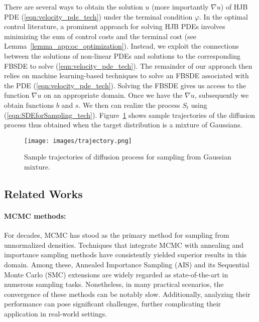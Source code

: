 There are several ways to obtain the solution $u$ (more importantly $\nabla u$) of HJB PDE (\ref{eqn:velocity_pde_tech}) under the terminal condition $\varphi$. In the optimal control literature, a prominent approach for solving HJB PDEs involves minimizing the sum of control costs and the terminal cost (see Lemma~\ref{lemma_app:oc_optimization}). %
Instead, we exploit the connections between the solutions of non-linear PDEs and solutions to the corresponding FBSDE to solve (\ref{eqn:velocity_pde_tech}). The remainder of our approach then relies on machine learning-based techniques to solve an FBSDE associated with the PDE (\ref{eqn:velocity_pde_tech}). Solving the FBSDE gives us access to the function $\nabla u$ on an appropriate domain. Once we have the $\nabla u$, subsequently we obtain functions $b$ and $s$. We then can realize the process $S_t$ using (\ref{eqn:SDEforSampling_tech}). Figure~\ref{fig:trajectory_tech} shows sample trajectories of the diffusion process thus obtained when the target distribution is a mixture of Gaussians.

\begin{figure}
  \centering
  \texttt{[image: images/trajectory.png]}
  \caption{Sample trajectories of diffusion process for sampling from Gaussian mixture.}
  \label{fig:trajectory_tech}
\end{figure}

\subsection{Related Works}
\paragraph{MCMC methods:} For decades, MCMC has stood as the primary method for sampling from unnormalized densities. Techniques that integrate MCMC with annealing and importance sampling methods have consistently yielded superior results in this domain. Among these, Annealed Importance Sampling (AIS) \cite{neal_annealed_2001} and its Sequential Monte Carlo (SMC) \cite{del_moral_sequential_2006} extensions are widely regarded as state-of-the-art in numerous sampling tasks. Nonetheless, in many practical scenarios, the convergence of these methods can be notably slow. Additionally, analyzing their performance can pose significant challenges, further complicating their application in real-world settings.
